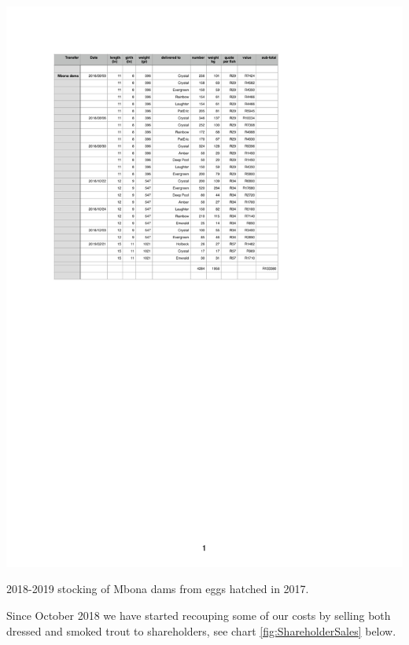 \begin{table}[H]
  \centering
  \includegraphics[scale = 1.2]{tables/TablesMbonaDamSales.pdf}
   \caption{2018-2019 stocking of Mbona dams from eggs hatched in 2017.}
  \label{tab:MbonaDamSales2018}
\end{table}

Since October 2018 we have started recouping some of our costs by selling both dressed 
and smoked trout to shareholders,
see chart \ref{fig:ShareholderSales} below.

